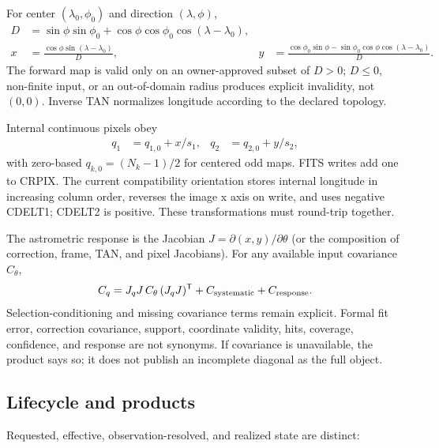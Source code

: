 \documentclass[11pt]{article}
\newcommand{\T}{\mathsf{T}}
\begin{document}
For center $(\lambda_0,\phi_0)$ and direction $(\lambda,\phi)$,
\begin{align}
 D &= \sin\phi\sin\phi_0+
      \cos\phi\cos\phi_0\cos(\lambda-\lambda_0),\\
 x &= \frac{\cos\phi\sin(\lambda-\lambda_0)}{D}, &
 y &= \frac{\cos\phi_0\sin\phi-
       \sin\phi_0\cos\phi\cos(\lambda-\lambda_0)}{D}.
 \label{eq:audit-tan}
\end{align}
The forward map is valid only on an owner-approved subset of $D>0$; $D\le0$,
non-finite input, or an out-of-domain radius produces explicit invalidity, not
$(0,0)$.  Inverse TAN normalizes longitude according to the declared topology.

Internal continuous pixels obey
\begin{align}
 q_1 &= q_{1,0}+x/s_1, & q_2 &= q_{2,0}+y/s_2,
 \label{eq:audit-wcs}
\end{align}
with zero-based $q_{k,0}=(N_k-1)/2$ for centered odd maps.  FITS writes add one
to CRPIX.  The current compatibility orientation stores internal longitude in
increasing column order, reverses the image x axis on write, and uses negative
CDELT1; CDELT2 is positive.  These transformations must round-trip together.

The astrometric response is the Jacobian $J=\partial(x,y)/\partial\theta$ (or
the composition of correction, frame, TAN, and pixel Jacobians).  For any
available input covariance $C_\theta$,
\begin{equation}
 C_q=J_qJ\,C_\theta\,(J_qJ)^{\T}+C_{\rm systematic}+C_{\rm response}.
 \label{eq:audit-cov}
\end{equation}
Selection-conditioning and missing covariance terms remain explicit.
Formal fit error, correction covariance, support, coordinate validity, hits,
coverage, confidence, and response are not synonyms.  If covariance is
unavailable, the product says so; it does not publish an incomplete diagonal as
the full object.

\subsection{Lifecycle and products}

Requested, effective, observation-resolved, and realized state are distinct:
\end{document}
